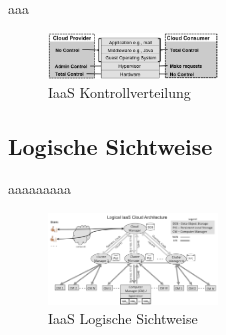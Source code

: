 aaa
\begin{figure}[H]
    \centering
	\includegraphics[width=0.4\textwidth]{Images/IaaSControl}
	\caption{IaaS Kontrollverteilung \cite{Badger}}
	\label{IaaSControl}
\end{figure}

\subsection{Logische Sichtweise}
aaaaaaaaa
\begin{figure}[H]
    \centering
	\includegraphics[width=0.4\textwidth]{Images/IaaSLogic}
	\caption{IaaS Logische Sichtweise \cite{Badger}}
	\label{IaaSLogic}
\end{figure}


